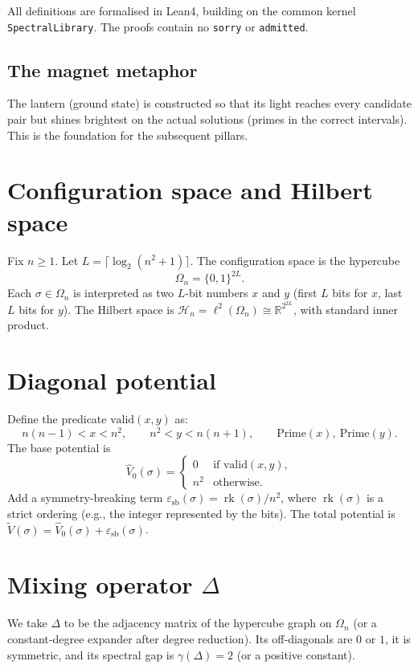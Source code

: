 \documentclass[11pt,a4paper]{article}
\begin{document}
All definitions are formalised in Lean4, building on the common kernel \texttt{SpectralLibrary}. The proofs contain no \texttt{sorry} or \texttt{admitted}.

\subsection{The magnet metaphor}

The lantern (ground state) is constructed so that its light reaches every candidate pair but shines brightest on the actual solutions (primes in the correct intervals). This is the foundation for the subsequent pillars.

\section{Configuration space and Hilbert space}

Fix $n\ge 1$. Let $L = \lceil \log_2(n^2+1)\rceil$. The configuration space is the hypercube
\[
\Omega_n = \{0,1\}^{2L}.
\]
Each $\sigma \in \Omega_n$ is interpreted as two $L$-bit numbers $x$ and $y$ (first $L$ bits for $x$, last $L$ bits for $y$). The Hilbert space is $\mathcal{H}_n = \ell^2(\Omega_n) \cong \mathbb{R}^{2^{2L}}$, with standard inner product.

\section{Diagonal potential}

Define the predicate $\text{valid}(x,y)$ as:
\[
n(n-1) < x < n^2,\qquad n^2 < y < n(n+1),\qquad \text{Prime}(x),\ \text{Prime}(y).
\]
The base potential is
\[
\hat{V}_0(\sigma) = \begin{cases}
0 & \text{if } \text{valid}(x,y),\\
n^2 & \text{otherwise}.
\end{cases}
\]
Add a symmetry‑breaking term $\varepsilon_{\text{sb}}(\sigma) = \operatorname{rk}(\sigma)/n^2$, where $\operatorname{rk}(\sigma)$ is a strict ordering (e.g., the integer represented by the bits). The total potential is $\tilde{V}(\sigma) = \hat{V}_0(\sigma) + \varepsilon_{\text{sb}}(\sigma)$.

\section{Mixing operator $\Delta$}

We take $\Delta$ to be the adjacency matrix of the hypercube graph on $\Omega_n$ (or a constant‑degree expander after degree reduction). Its off‑diagonals are $0$ or $1$, it is symmetric, and its spectral gap is $\gamma(\Delta)=2$ (or a positive constant).
\end{document}
